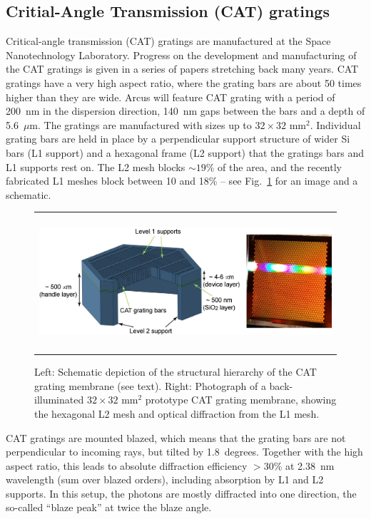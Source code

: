 \documentclass[12pt]{spieman}  %
\begin{document}
\begin{spacing}{1}
\subsection{Critial-Angle Transmission (CAT) gratings}
Critical-angle transmission (CAT) gratings are manufactured at the Space Nanotechnology Labo\-ra\-tory. Progress on the development and manufacturing of the CAT gratings is given in a series of papers stretching back many years\cite{10.1117/12.926827,2022ApJ...934..171H}.
CAT gratings have a very high aspect ratio, where the grating bars are about 50 times higher than they are wide. Arcus will feature CAT grating with a period of 200~nm in the dispersion direction, 140~nm gaps between the bars and a depth of 5.6~$\mu$m. The gratings are manufactured with sizes up to $32\times32$ mm$^2$. Individual grating bars are held in place by a perpendicular support structure of wider Si bars (L1 support) and a hexagonal frame (L2 support) that the gratings bars and L1 supports rest on. The L2 mesh blocks $\sim 19$\% of the area, and the recently fabricated L1 meshes block between 10 and 18\% -- see Fig.~\ref{fig:cell} for an image and a schematic.

\begin{figure} [ht]
    \begin{center}
    \begin{tabular}{c} %
    \includegraphics[height=5cm]{unitcell+pic.jpg}
    \end{tabular}
    \end{center}
    \caption {\label{fig:cell}
    Left: Schematic depiction of the structural hierarchy of the CAT grating membrane (see text). Right: Photograph of a back-illuminated $32\times32$ mm$^2$ prototype CAT grating membrane, showing the hexagonal L2 mesh and optical diffraction from the L1 mesh.
    }
\end{figure}

CAT gratings are mounted blazed, which means that the grating bars are not perpendicular to incoming rays, but tilted by 1.8~degrees. Together with the high aspect ratio, this leads to absolute diffraction efficiency $> 30$\%  at 2.38~nm wavelength (sum over blazed orders), including absorption by L1 and L2 supports\cite{doi:10.1117/12.2314180}. In this setup, the photons are mostly diffracted into one direction, the so-called ``blaze peak'' at twice the blaze angle.


\end{spacing}
\end{document}
